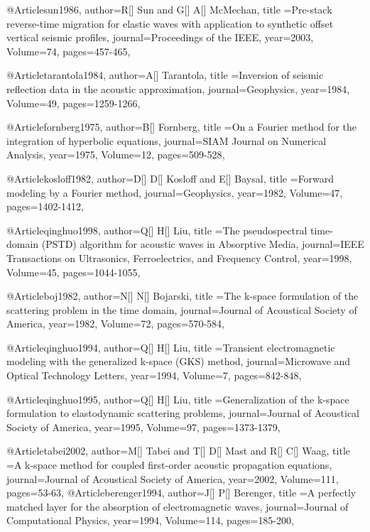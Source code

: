 {@Article{sun1986,
  author={R[] Sun and G[] A[] McMechan},
  title ={Pre-stack reverse-time migration for elastic waves with application to synthetic offset vertical seismic profiles},
  journal={Proceedings of the IEEE},
  year=2003,
  Volume=74,
  pages={457-465},
}

@Article{tarantola1984,
  author={A[] Tarantola},
  title ={Inversion of seismic reflection data in the acoustic approximation},
  journal={Geophysics},
  year=1984,
  Volume=49,
  pages={1259-1266},
}

@Article{fornberg1975,
  author={B[] Fornberg},
  title ={On a Fourier method for the integration of hyperbolic equations},
  journal={SIAM Journal on Numerical Analysis},
  year=1975,
  Volume=12,
  pages={509-528},
}

@Article{kosloff1982,
  author={D[] D[] Kosloff and E[] Baysal},
  title ={Forward modeling by a Fourier method},
  journal={Geophysics},
  year=1982,
  Volume=47,
  pages={1402-1412},
}

@Article{qinghuo1998,
  author={Q[] H[] Liu},
  title ={The pseudospectral time-domain (PSTD) algorithm for acoustic waves in Absorptive Media},
  journal={IEEE Transactions on Ultrasonics, Ferroelectrics, and Frequency Control},
  year=1998,
  Volume=45,
  pages={1044-1055},
}

@Article{boj1982,
  author={N[] N[] Bojarski},
  title ={The k-space formulation of the scattering problem in the time domain},
  journal={Journal of Acoustical Society of America},
  year=1982,
  Volume=72,
  pages={570-584},
}


@Article{qinghuo1994,
  author={Q[] H[] Liu},
  title ={Transient electromagnetic modeling with the generalized k-space (GKS) method},
  journal={Microwave and Optical Technology Letters},
  year=1994,
  Volume=7,
  pages={842-848},
}

@Article{qinghuo1995,
  author={Q[] H[] Liu},
  title ={Generalization of the k-space formulation to elastodynamic scattering problems},
  journal={Journal of Acoustical Society of America},
  year=1995,
  Volume=97,
  pages={1373-1379},
}

@Article{tabei2002,
  author={M[] Tabei and T[] D[] Mast and R[] C[] Waag},
  title ={A k-space method for coupled first-order acoustic propagation equations},
  journal={Journal of Acoustical Society of America},
  year=2002,
  Volume=111,
  pages={53-63},
}
@Article{berenger1994,
  author={J[] P[] Berenger},
  title ={A perfectly matched layer for the absorption of electromagnetic waves},
  journal={Journal of Computational Physics},
  year=1994,
  Volume=114,
  pages={185-200},
}

}
